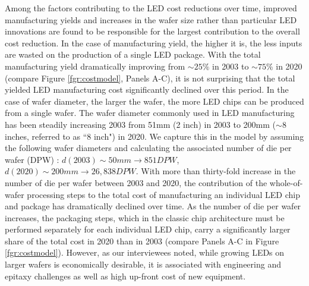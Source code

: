 \documentclass[twoside,twocolumn,9pt]{article}
\begin{document}
Among the factors contributing to the LED cost reductions over time, improved manufacturing yields and increases in the wafer size rather than particular LED innovations are found to be responsible for the largest contribution to the overall cost reduction. In the case of manufacturing yield, the higher it is, the less inputs are wasted on the production of a single LED package. With the total manufacturing yield dramatically improving from $\sim25\%$ in 2003 to $\sim75\%$ in 2020 (compare Figure \ref{fgr:costmodel}, Panels A-C), it is not surprising that the total yielded LED manufacturing cost significantly declined over this period. In the case of wafer diameter, the larger the wafer, the more LED chips can be produced from a single wafer. The wafer diameter commonly used in LED manufacturing has been steadily increasing 2003 from 51mm (2 inch) in 2003 to 200mm ($\sim$8 inches, referred to as “8 inch") in 2020. We capture this in the model by assuming the following wafer diameters and calculating the associated number of die per wafer (DPW) \cite{de2005investigation}: $d(2003)\sim 50 mm \rightarrow851 DPW$, $d(2020)\sim200 mm \rightarrow 26,838 DPW$. With more than thirty-fold increase in the number of die per wafer between 2003 and 2020, the contribution of the whole-of-wafer processing steps to the total cost of manufacturing an individual LED chip and package has dramatically declined over time. As the number of die per wafer increases, the packaging steps, which in the classic chip architecture must be performed separately for each individual LED chip, carry a significantly larger share of the total cost in 2020 than in 2003 (compare Panels A-C in Figure \ref{fgr:costmodel}). However, as our interviewees noted, while growing LEDs on larger wafers is economically desirable, it is associated with engineering and epitaxy challenges as well as high up-front cost of new equipment.
\end{document}

